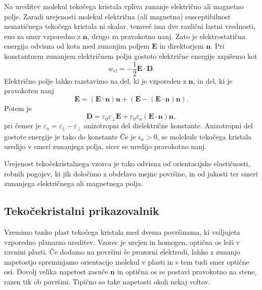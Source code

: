 Na ureditev molekul tekočega kristala vpliva zunanje električno ali magnetno polje.
Zaradi urejenosti molekul električna (ali magnetna) susceptibilnost nematičnega tekočega
kristala ni skalar, temveč ima dve različni lastni vrednosti,
eno za smer vzporedno z $\mathbf{n}$, drugo za pravokotno nanj. Zato je
elektrostatična energija odvisna od kota med zunanjim poljem $\mathbf{E}$
in direktorjem $\mathbf{n}$. Pri konstantnem zunanjem električnem polju 
gostoto električne energije zapišemo kot 
\begin{equation}
w_{el}=-\frac{1}{2}\mathbf{E}\cdot \mathbf{D}.
\label{lcwe}
\end{equation}
Električno polje lahko razstavimo na del, ki je vzporeden z $\mathbf{n}$, in del, ki je
pravokoten nanj
\begin{equation}
\mathbf{E} = (\mathbf{E} \cdot \mathbf{n}) \mathbf{n} + \left( \mathbf{E} - 
(\mathbf{E} \cdot \mathbf{n}) \mathbf{n} \right).
\end{equation}
Potem je 
\begin{equation}
\mathbf{D} = \varepsilon_0 \varepsilon_\bot \mathbf{E} + \varepsilon_0 \varepsilon_a
(\mathbf{E}\cdot\mathbf{n})\mathbf{n},
\label{7.56a}
\end{equation}
pri čemer je $\varepsilon_a = \varepsilon_\parallel - \varepsilon_\bot$ anizotropni
del dielektrične konstante. Anizotropni del gostote energije je tako do konstante
Če je $\epsilon_{a}>0$, se molekule tekočega kristala uredijo v smeri 
zunanjega polja, sicer se uredijo pravokotno nanj.

Urejenost tekočekristalnega vzorca je tako odvisna od orientacijske
elastičnosti, robnih pogojev, ki jih določimo z obdelavo mejne
površine, in od jakosti ter smeri zunanjega električnega ali magnetnega polja.

\subsection*{Tekočekristalni prikazovalnik}
Vzemimo tanko plast tekočega kristala med dvema površinama, ki vsiljujeta
vzporedno planarno ureditev. Vzorec je urejen in homogen, optična os leži v ravnini 
plasti. Če dodamo na površini še prozorni elektrodi, lahko
z zunanjo napetostjo spreminjamo orientacijo molekul v plasti in s tem tudi 
smer optične osi. Dovolj velika napetost zasuče $\mathbf{n}$ in optična os
se postavi pravokotno na stene, razen tik ob površini. Tipično so take napetosti okoli 
nekaj voltov.

